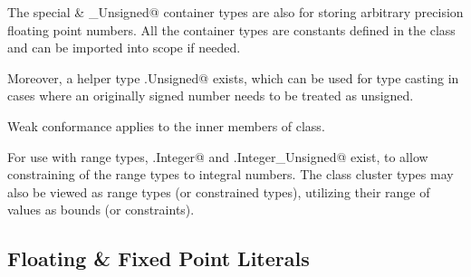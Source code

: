 The special \lstinline@Decimal@ \& \lstinline@Decimal_Unsigned@ container types are also for storing arbitrary precision floating point numbers. All the container types are constants defined in the \lstinline@Number@ class and can be imported into scope if needed. 

Moreover, a helper type \lstinline@Number.Unsigned@ exists, which can be used for type casting in cases where an originally signed number needs to be treated as unsigned. 

Weak conformance applies to the inner members of \lstinline@Number@ class. 

For use with range types, \lstinline@Number.Integer@ and \lstinline@Number.Integer_Unsigned@ exist, to allow constraining of the range types to integral numbers. The class cluster types may also be viewed as range types (or constrained types), utilizing their range of values as bounds (or constraints). 






\subsection{Floating \& Fixed Point Literals}
\label{sec:floatliterals}
\label{sec:fixedpointliterals}

